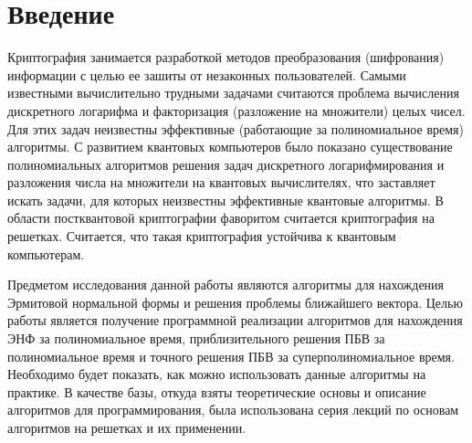 \newpage

\section{Введение}

Криптография занимается разработкой методов преобразования (шифрования) информации с целью ее зашиты от незаконных пользователей. Самыми известными вычислительно трудными задачами считаются проблема вычисления дискретного логарифма и факторизация (разложение на множители) целых чисел. Для этих задач неизвестны эффективные (работающие за полиномиальное время) алгоритмы. С развитием квантовых компьютеров было показано существование полиномиальных алгоритмов решения задач дискретного логарифмирования и разложения числа на множители на квантовых вычислителях, что заставляет искать задачи, для которых неизвестны эффективные квантовые алгоритмы. В области постквантовой криптографии фаворитом считается криптография на решетках. Считается, что такая криптография устойчива к квантовым компьютерам.

Предметом исследования данной работы являются алгоритмы для нахождения Эрмитовой нормальной формы и решения проблемы ближайшего вектора. Целью работы является получение программной реализации алгоритмов для нахождения ЭНФ за полиномиальное время, приблизительного решения ПБВ за полиномиальное время и точного решения ПБВ за суперполиномиальное время. Необходимо будет показать, как можно использовать данные алгоритмы на практике. В качестве базы, откуда взяты теоретические основы и описание алгоритмов для программирования, была использована серия лекций по основам алгоритмов на решетках и их применении.


\clearpage

